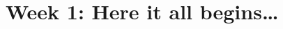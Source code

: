 \documentclass[11pt,a4paper]{book}
\begin{document}
%
% 



\chapter{Week 1: Here it all begins\ldots}





\end{document}

